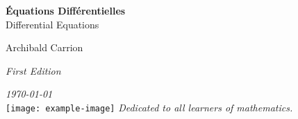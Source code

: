 \documentclass[11pt,a4paper]{book}
\newcommand{\booktitle}{\Huge\textbf{\textcolor{blue!70!black}{Équations Différentielles}}}
\newcommand{\booksubtitle}{\Large Differential Equations}
\newcommand{\authorname}{\Large Archibald Carrion}
\newcommand{\edition}{\normalsize \textit{First Edition}}
\newcommand{\publishdate}{\normalsize \textit{\today}}
\begin{document}
\begin{titlepage}
    \begin{center}
        \vspace*{1cm}
        \booktitle \\
        \vspace{0.5cm}
        \booksubtitle \\
        \vspace{1.5cm}

        \authorname \\
        \vspace{0.5cm}

        \edition \\
        \vspace{0.5cm}

        \publishdate \\
        \vfill
        \texttt{[image: example-image]} %
        \vfill
        \textit{Dedicated to all learners of mathematics.}
    \end{center}
\end{titlepage}

\tableofcontents
\newpage






\end{document}

